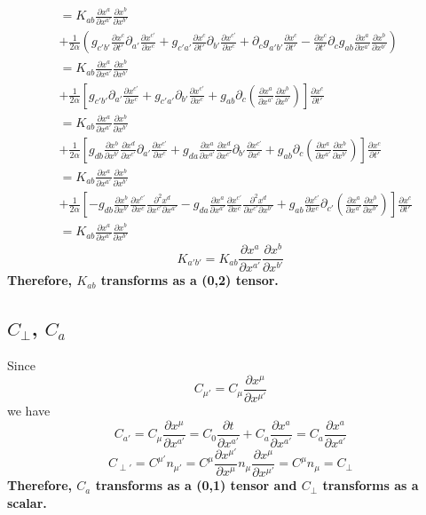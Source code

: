 \documentclass{article}
\begin{document}
\begin{align*}
& = K_{ab}\frac{\partial x^{a}}{\partial x^{a'}}\frac{\partial x^{b}}{\partial x^{b'}}\\
& + \frac{1}{2\alpha}(g_{c'b'}\frac{\partial x^{c}}{\partial t'}\partial_{a'}\frac{\partial x^{c'}}{\partial x^{c}} + g_{c'a'}\frac{\partial x^{c}}{\partial t'}\partial_{b'}\frac{\partial x^{c'}}{\partial x^{c}} + \partial_{c}g_{a'b'}\frac{\partial x^{c}}{\partial t'} - \frac{\partial x^{c}}{\partial t'}\partial_{c}g_{ab}\frac{\partial x^{a}}{\partial x^{a'}}\frac{\partial x^{b}}{\partial x^{b'}})\\
& = K_{ab}\frac{\partial x^{a}}{\partial x^{a'}}\frac{\partial x^{b}}{\partial x^{b'}}\\
& + \frac{1}{2\alpha}[g_{c'b'}\partial_{a'}\frac{\partial x^{c'}}{\partial x^{c}} + g_{c'a'}\partial_{b'}\frac{\partial x^{c'}}{\partial x^{c}} + g_{ab}\partial_{c}(\frac{\partial x^{a}}{\partial x^{a'}}\frac{\partial x^{b}}{\partial x^{b'}})]\frac{\partial x^{c}}{\partial t'}\\
& = K_{ab}\frac{\partial x^{a}}{\partial x^{a'}}\frac{\partial x^{b}}{\partial x^{b'}}\\
& + \frac{1}{2\alpha}[g_{db}\frac{\partial x^{b}}{\partial x^{b'}}\frac{\partial x^{d}}{\partial x^{c'}}\partial_{a'}\frac{\partial x^{c'}}{\partial x^{c}} + g_{da}\frac{\partial x^{a}}{\partial x^{a'}}\frac{\partial x^{d}}{\partial x^{c'}}\partial_{b'}\frac{\partial x^{c'}}{\partial x^{c}}  + g_{ab}\partial_{c}(\frac{\partial x^{a}}{\partial x^{a'}}\frac{\partial x^{b}}{\partial x^{b'}})]\frac{\partial x^{c}}{\partial t'}\\
& = K_{ab}\frac{\partial x^{a}}{\partial x^{a'}}\frac{\partial x^{b}}{\partial x^{b'}}\\
& + \frac{1}{2\alpha}[-g_{db}\frac{\partial x^{b}}{\partial x^{b'}}\frac{\partial x^{c'}}{\partial x^{c}}\frac{\partial^2 x^{d}}{\partial x^{c'}\partial x^{a'}} - g_{da}\frac{\partial x^{a}}{\partial x^{a'}}\frac{\partial x^{c'}}{\partial x^{c}}\frac{\partial^2 x^{d}}{\partial x^{c'}\partial x^{b'}} + g_{ab}\frac{\partial x^{c'}}{\partial x^{c}}\partial_{c'}(\frac{\partial x^{a}}{\partial x^{a'}}\frac{\partial x^{b}}{\partial x^{b'}})]\frac{\partial x^{c}}{\partial t'}\\
& = K_{ab}\frac{\partial x^{a}}{\partial x^{a'}}\frac{\partial x^{b}}{\partial x^{b'}}
\end{align*}
\[
\boxed{
K_{a'b'} = K_{ab}\frac{\partial x^{a}}{\partial x^{a'}}\frac{\partial x^{b}}{\partial x^{b'}}
}
\]
{\bf {\color{red}Therefore, $K_{ab}$ transforms as a (0,2) tensor.}}
\subsection{$C_{\perp}$, $C_{a}$}
Since
\[
C_{\mu'} = C_{\mu}\frac{\partial x^{\mu}}{\partial x^{\mu'}}
\]
we have
\[
\boxed{
C_{a'} = C_{\mu}\frac{\partial x^{\mu}}{\partial x^{a'}} = C_{0}\frac{\partial t}{\partial x^{a'}} + C_{a}\frac{\partial x^{a}}{\partial x^{a'}} = C_{a}\frac{\partial x^{a}}{\partial x^{a'}}
}
\]
\[
\boxed{
C_{\perp'} = C^{\mu'}n_{\mu'} = C^{\mu}\frac{\partial x^{\mu'}}{\partial x^{\mu}}n_{\mu}\frac{\partial x^{\mu}}{\partial x^{\mu'}} = C^{\mu}n_{\mu} = C_{\perp}
}
\]
{\bf {\color{red}Therefore, $C_{a}$ transforms as a (0,1) tensor and $C_{\perp}$ transforms as a scalar.}}
\end{document}
